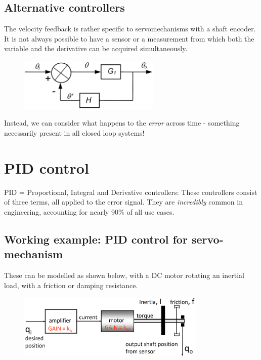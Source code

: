 \documentclass[class=report, crop=false, 12pt,a4paper]{standalone}
\begin{document}
\subsection{Alternative controllers}
The velocity feedback is rather specific to servomechanisms with a shaft encoder. It is not always possible to have a sensor or a measurement from which both the variable and the derivative can be acquired simultaneously. 
\begin{figure}[H]
  \centerline{\includegraphics[width = 0.6\textwidth]{../img/diagram116.png}}
  \caption{}
\end{figure}
Instead, we can consider what happens to the \textit{error} across time - something necessarily present in all closed loop systems!
\section{PID control}
PID = Proportional, Integral and Derivative controllers: These controllers consist of three terms, all applied to the error signal. They are \textit{incredibly} common in engineering, accounting for nearly 90\% of all use cases. 
\subsection{Working example: PID control for servo-mechanism}
These can be modelled as shown below, with a DC motor rotating an inertial load, with a friction or damping resistance.
\begin{figure}[H]
  \centerline{\includegraphics[width = 0.8\textwidth]{../img/diagram117.png}}
  \caption{}
\end{figure}
\end{document}

